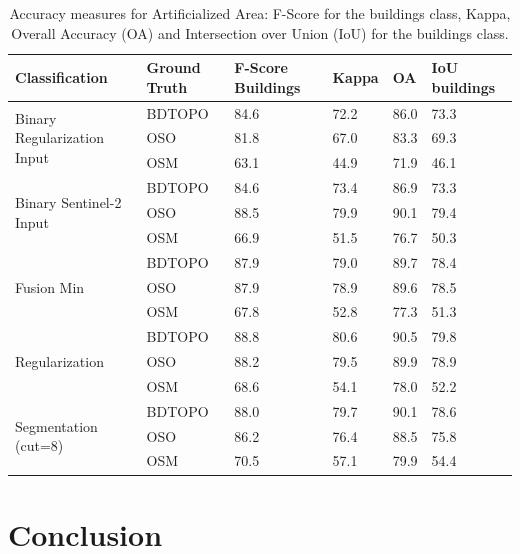 \documentclass[10pt]{article}
\newcommand{\tile}{41000_30000}
\newcommand{\region}{finistere}
\begin{document}
\begin{table}[H]
	\centering
	\begin{tabular}{llp{1.5cm}llp{1.5cm}}
		\toprule
		\textbf{Classification} & \textbf{Ground Truth} & \textbf{F-Score Buildings} & \textbf{Kappa} & \textbf{OA} & \textbf{IoU buildings}		\\\hline
		\multirow{3}{*}{Binary Regularization Input}& BDTOPO & 84.6 & 72.2 & 86.0 & 73.3 \\
		& OSO & 81.8 & 67.0 & 83.3 & 69.3 \\
		& OSM & 63.1 & 44.9 & 71.9 & 46.1 \\\hline
		\multirow{3}{*}{Binary Sentinel-2 Input}& BDTOPO & 84.6 & 73.4 & 86.9 & 73.3 \\
		& OSO & 88.5 & 79.9 & 90.1 & 79.4 \\
		& OSM & 66.9 & 51.5 & 76.7 & 50.3 \\\hline
		\multirow{3}{*}{Fusion Min}& BDTOPO & 87.9 & 79.0 & 89.7 & 78.4 \\
		& OSO & 87.9 & 78.9 & 89.6 & 78.5 \\
		& OSM & 67.8 & 52.8 & 77.3 & 51.3 \\\hline
		\multirow{3}{*}{Regularization}& BDTOPO & 88.8 & 80.6 & 90.5 & 79.8 \\
		& OSO & 88.2 & 79.5 & 89.9 & 78.9 \\
		& OSM & 68.6 & 54.1 & 78.0 & 52.2 \\\hline
		\multirow{3}{*}{Segmentation (cut=8)}& BDTOPO & 88.0 & 79.7 & 90.1 & 78.6 \\
		& OSO & 86.2 & 76.4 & 88.5 & 75.8 \\
		& OSM & 70.5 & 57.1 & 79.9 & 54.4 \\\hline
		\bottomrule
	\end{tabular}
	\caption{Accuracy measures for Artificialized Area: F-Score for the buildings class, Kappa, Overall Accuracy (OA) and Intersection over Union (IoU) for the buildings class.}
	\label{table:accuracy-bin\region}
\end{table}

\renewcommand{\region}{finistere}
\renewcommand{\tile}{41000_30000}
\newpage
\section{Conclusion}

\pagebreak
\printbibliography[heading=bibintoc,heading=bibnumbered]

\newpage
\renewcommand{\thesubsection}{\Alph{subsection}}
\pagebreak  
\end{document}
